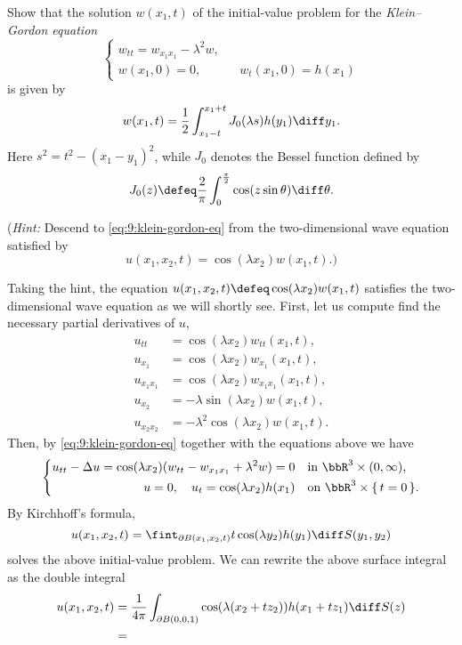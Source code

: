 \begin{problem}
  Show that the solution \(w(x_1,t)\) of the initial-value problem for the
  \emph{Klein--Gordon equation}
  \begin{equation}
    \label{eq:9:klein-gordon-eq}
    \left\{
      \begin{aligned}
        w_{tt}=w_{x_1x_1}-\lambda^2w,\\
        w(x_1,0)=0,&&w_t(x_1,0)=h(x_1)
      \end{aligned}
    \right.
  \end{equation}
  is given by
  \[
    w(x_1,t)=\frac{1}{2}\int_{x_1-t}^{x_1+t}J_0(\lambda s) h(y_1)\diff y_1.
  \]
  Here \(s^2=t^2-(x_1-y_1)^2\), while \(J_0\) denotes the Bessel function
  defined by
  \[
    J_0(z)\defeq \frac{2}{\pi}\int_0^{\frac{\pi}{2}}\cos(z\sin\theta)\diff\theta.
  \]

  \noindent (\emph{Hint:} Descend to \eqref{eq:9:klein-gordon-eq} from the
  two-dimensional wave equation satisfied by
  \[
    u(x_1,x_2,t)=\cos(\lambda x_2)w(x_1,t).\text{)}
  \]
\end{problem}
\begin{solution}
  Taking the hint, the equation \(u(x_1,x_2,t)\defeq\cos(\lambda
  x_2)w(x_1,t)\) satisfies the two-dimensional wave equation as we will
  shortly see. First, let us compute find the necessary partial derivatives
  of \(u\),
  \begin{align*}
    u_{tt}&=\cos(\lambda x_2)w_{tt}(x_1,t),\\
    u_{x_1}&=\cos(\lambda x_2)w_{x_1}(x_1,t),\\
    u_{x_1x_1}&=\cos(\lambda x_2)w_{x_1x_1}(x_1,t),\\
    u_{x_2}&=-\lambda\sin(\lambda x_2)w(x_1,t),\\
    u_{x_2x_2}&=-\lambda^2\cos(\lambda x_2)w(x_1,t).
  \end{align*}
  Then, by \eqref{eq:9:klein-gordon-eq} together with the equations above
  we have
  \[
    \left\{
      \begin{aligned}
        u_{tt}-\Delta u=\cos(\lambda x_2)(w_{tt}-w_{x_1x_1}+\lambda^2 w)=0
        &&&\text{in \(\bbR^3\times(0,\infty)\),}\\
        u=0,\quad u_t=\cos(\lambda x_2)h(x_1)&&&\text{on
          \(\bbR^3\times\{\,t=0\,\}\).}
      \end{aligned}
    \right.
  \]
  By Kirchhoff's formula,
  \[
    u(x_1,x_2,t)=\fint_{\partial
      B(x_1,x_2,t)}t\cos(\lambda y_2)h(y_1)\diff S(y_1,y_2)
  \]
  solves the above initial-value problem. We can rewrite the above surface
  integral as the double integral
  \begin{align*}
    u(x_1,x_2,t)
    &=\frac{1}{4\pi}\int_{\partial B(0,0,1)}
      \cos(\lambda (x_2+tz_2))h(x_1+tz_1)\diff S(z)\\
    &=
  \end{align*}
\end{solution}
\newpage

